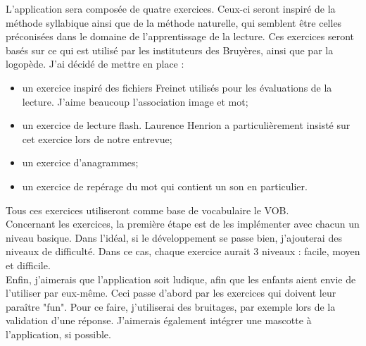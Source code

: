L'application sera composée de quatre exercices. Ceux-ci seront inspiré de la méthode syllabique ainsi que de la méthode naturelle, qui semblent être celles préconisées dans le domaine de l'apprentissage de la lecture. Ces exercices seront basés sur ce qui est utilisé par les instituteurs des Bruyères, ainsi que par la logopède. J'ai décidé de mettre en place :
\begin{itemize}
\item un exercice inspiré des fichiers Freinet utilisés pour les évaluations de la lecture. J'aime beaucoup l'association image et mot;
\item un exercice de lecture flash. Laurence Henrion a particulièrement insisté sur cet exercice lors de notre entrevue;
\item un exercice d'anagrammes;
\item un exercice de repérage du mot qui contient un son en particulier.
\end{itemize}
Tous ces exercices utiliseront comme base de vocabulaire le VOB.\\

Concernant les exercices, la première étape est de les implémenter avec chacun un niveau basique. Dans l'idéal, si le développement se passe bien, j'ajouterai des niveaux de difficulté. Dans ce cas, chaque exercice aurait 3 niveaux : facile, moyen et difficile.\\

Enfin, j'aimerais que l'application soit ludique, afin que les enfants aient envie de l'utiliser par eux-même. Ceci passe d'abord par les exercices qui doivent leur paraître "fun". Pour ce faire, j'utiliserai des bruitages, par exemple lors de la validation d'une réponse. J'aimerais également intégrer une mascotte à l'application, si possible.